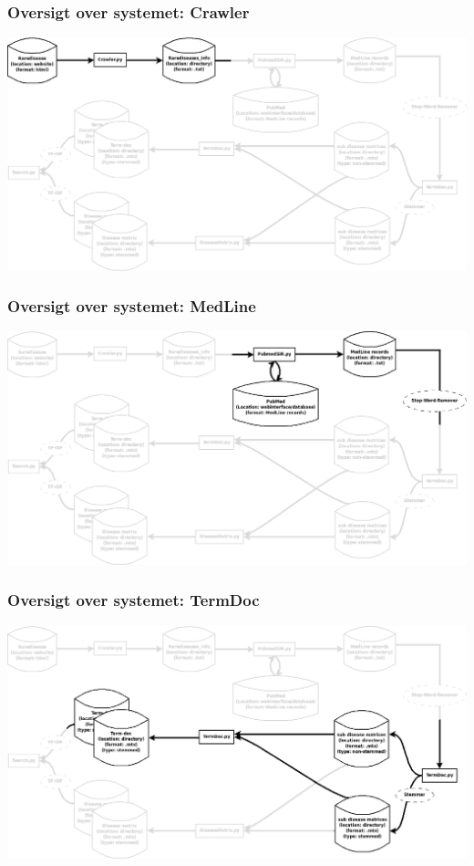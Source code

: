 \documentclass[xcolor=table]{beamer}
\begin{document}
\begin{frame}

  \frametitle{Oversigt over systemet: Crawler}

  \begin{center}
    \includegraphics[width=1.0\textwidth]{system_overview1}
  \end{center}

\end{frame}
\begin{frame}

  \frametitle{Oversigt over systemet: MedLine}

  \begin{center}
    \includegraphics[width=1.0\textwidth]{system_overview2}
  \end{center}

\end{frame}
\begin{frame}

  \frametitle{Oversigt over systemet: TermDoc}

  \begin{center}
    \includegraphics[width=1.0\textwidth]{system_overview3}
  \end{center}
  
\end{frame}
\end{document}
